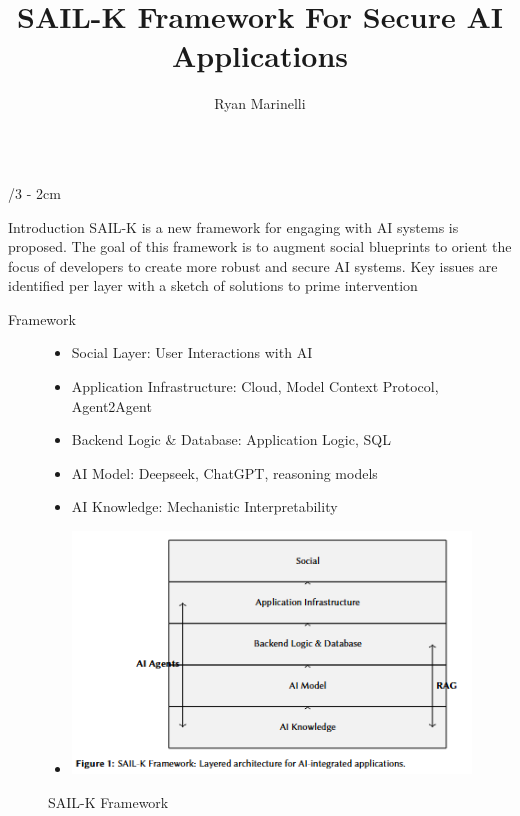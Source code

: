 \documentclass[portrait]{uioposter}
\title{SAIL-K Framework For Secure AI Applications}
\author
{%
    Ryan Marinelli \inst{1}
}
\institute
{
    \inst{1} Department of Informatics 

}
\begin{document}
\begin{frame}
\begin{columns}[onlytextwidth]


\begin{column}{\textwidth/3 - 2cm}
    \begin{block}{Introduction}
 SAIL-K is a new framework for engaging with AI systems is proposed. The goal of this framework is to augment social blueprints to orient the focus of developers to create more robust and secure AI systems. Key issues are identified per layer with a sketch of solutions to prime intervention 
    \end{block}

    \begin{block}{Framework}
    \begin{figure}
        \centering
        \begin{itemize}
            \item Social Layer: User Interactions with AI
            \item Application Infrastructure: Cloud, Model Context Protocol, Agent2Agent 
            \item Backend Logic \& Database: Application Logic, SQL 
            \item AI Model: Deepseek, ChatGPT, reasoning models
            \item AI Knowledge: Mechanistic Interpretability
            \item \includegraphics[width=1.0\linewidth]{SAIL.png}
        \end{itemize}
        \caption{SAIL-K Framework}
        \label{fig:enter-label}
    \end{figure}
    \end{block}
\end{column}



\end{columns}
\end{frame}
\end{document}
